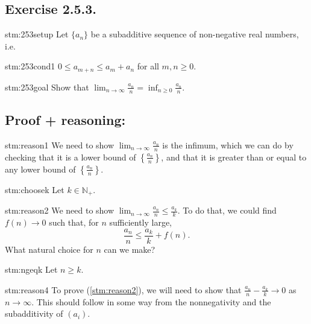 \subsection*{Exercise 2.5.3.}

\begin{exercise}{stm:253setup}
Let $\{a_n\}$ be a subadditive sequence of non-negative real numbers, i.e.
\end{exercise}

\begin{exercise}{stm:253cond1}
$0 \le a_{m+n} \le a_m + a_n$ for all $m,n \ge 0$.
\end{exercise}

\begin{exercise}{stm:253goal}
Show that $\lim_{n \to \infty} \frac{a_n}{n} = \inf_{n \ge 0} \frac{a_n}{n}$.
\end{exercise}

\subsection*{Proof {\color{blue}+ reasoning}:}

\begin{explanation}{stm:reason1}
We need to show $\lim_{n \to \infty} \frac{a_n}{n}$ is the infimum, which we can do by checking that it is a lower bound of $\left\{ \frac{a_n}{n} \right\}$, and that it is greater than or equal to any lower bound of $\left\{ \frac{a_n}{n} \right\}$.
\end{explanation}

\begin{statement}{stm:choosek}
Let $k \in \mathbb{N}_+$.
\end{statement}

\begin{explanation}{stm:reason2}
We need to show $\lim_{n \to \infty} \frac{a_n}{n} \le \frac{a_k}{k}$. To do that, we could find $f(n) \to 0$ such that, for $n$ sufficiently large, 
\[
\frac{a_n}{n} \le \frac{a_k}{k} + f(n).
\]
What natural choice for $n$ can we make?
\end{explanation}

\begin{statement}{stm:ngeqk}
Let $n \ge k$.
\end{statement}

\begin{explanation}{stm:reason4}
To prove (\ref{stm:reason2}), we will need to show that $\frac{a_n}{n} - \frac{a_k}{k} \to 0$ as $n \to \infty$. This should follow in some way from the nonnegativity and the subadditivity of $(a_i)$.
\end{explanation}

